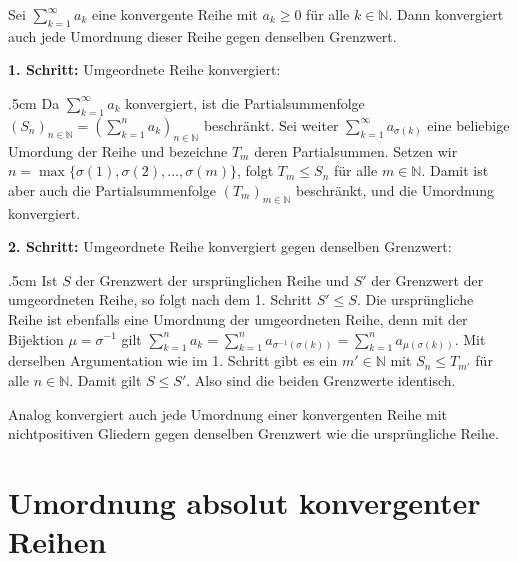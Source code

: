 \documentclass[fontsize=9pt,
               parskip=half-,
               DIV=14,
               listof=chapterentry,
               tocflat]{scrbook}
\newenvironment{indentblock}{\begin{adjustwidth}{.5cm}{}}{\end{adjustwidth}}
\newcommand{\proofstep}[1]{\textbf{\textcolor{sblau}{#1}}}
\begin{document}
\begin{theorem*}
Sei $\sum _{k=1}^{\infty }a_{k}$ eine konvergente Reihe mit $a_{k}\geq 0$ für alle $k\in \mathbb {N} $. Dann konvergiert auch jede Umordnung dieser Reihe gegen denselben Grenzwert.

\end{theorem*}

\begin{proof*}
\proofstep{1. Schritt:}
 Umgeordnete Reihe konvergiert:\begin{indentblock}
Da $\sum _{k=1}^{\infty }a_{k}$ konvergiert, ist die Partialsummenfolge $(S_{n})_{n\in \mathbb {N} }=\left(\sum _{k=1}^{n}a_{k}\right)_{n\in \mathbb {N} }$ beschränkt. Sei weiter $\sum _{k=1}^{\infty }a_{\sigma (k)}$ eine beliebige Umordung der Reihe und bezeichne $T_{m}$ deren Partialsummen. Setzen wir $n=\max\{\sigma (1),\sigma (2),\ldots ,\sigma (m)\}$, folgt $T_{m}\leq S_{n}$ für alle $m\in \mathbb {N} $. Damit ist aber auch die Partialsummenfolge $(T_{m})_{m\in \mathbb {N} }$ beschränkt, und die Umordnung konvergiert.

\end{indentblock}

\proofstep{2. Schritt:}
 Umgeordnete Reihe konvergiert gegen denselben Grenzwert:\begin{indentblock}
Ist $S$ der Grenzwert der ursprünglichen Reihe und $S'$ der Grenzwert der umgeordneten Reihe, so folgt nach dem 1. Schritt $S'\leq S$. Die ursprüngliche Reihe ist ebenfalls eine Umordnung der umgeordneten Reihe, denn mit der Bijektion $\mu =\sigma ^{-1}$ gilt $\sum _{k=1}^{n}a_{k}=\sum _{k=1}^{n}a_{\sigma ^{-1}(\sigma (k))}=\sum _{k=1}^{n}a_{\mu (\sigma (k))}$. Mit derselben Argumentation wie im 1. Schritt gibt es ein $m'\in \mathbb {N} $ mit $S_{n}\leq T_{m'}$ für alle $n\in \mathbb {N} $. Damit gilt $S\leq S'$. Also sind die beiden Grenzwerte identisch.

\end{indentblock}

\end{proof*}

\begin{hint*}
Analog konvergiert auch jede Umordnung einer konvergenten Reihe mit nichtpositiven Gliedern gegen denselben Grenzwert wie die ursprüngliche Reihe.

\end{hint*}

\section{Umordnung absolut konvergenter Reihen}
\end{document}
